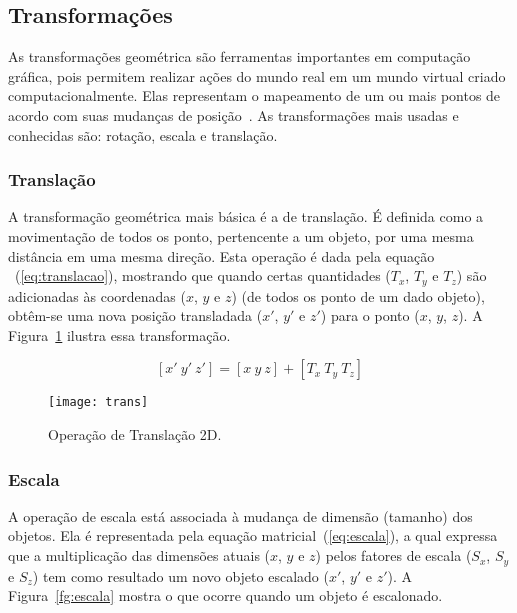 
\subsection{Transformações}
As transformações geométrica são ferramentas importantes em computação gráfica, pois permitem realizar ações do mundo real em um mundo virtual criado computacionalmente. Elas representam o mapeamento de um ou mais pontos de acordo com suas mudanças de posição~\cite{comp_grafica1}. As transformações mais usadas e conhecidas são: rotação, escala e translação. 

\subsubsection{Translação}
	A transformação geométrica mais básica é a de translação. É definida como a movimentação de todos os ponto, pertencente a um objeto, por uma mesma distância em uma mesma direção. Esta operação é dada pela equação ~(\ref{eq:translacao}), mostrando que quando certas quantidades ($T_x$, $T_y$ e $T_z$) são adicionadas às coordenadas ($x$, $y$ e $z$) (de todos os ponto de um dado objeto), obtêm-se uma nova posição transladada ($x'$, $y'$ e $z'$) para o ponto ($x$, $y$, $z$). A Figura~\ref{fg:trans} ilustra essa transformação. 

\begin{equation}\label{eq:translacao}
[x'\ y'\ z'] = [x\ y\ z] + [T_{x}\ T_{y}\ T_{z}]
\end{equation}

\begin{figure}[!ht]
	\centering
	\texttt{[image: trans]}
	\caption{Operação de Translação 2D.}
	\label{fg:trans}
\end{figure} 

\subsubsection{Escala}
	A operação de escala está associada à mudança de dimensão (tamanho) dos objetos. Ela é representada pela equação matricial~(\ref{eq:escala}), a qual expressa que a multiplicação das dimensões atuais ($x$, $y$ e $z$) pelos fatores de escala ($S_x$, $S_y$ e $S_z$) tem como resultado um novo objeto escalado ($x'$, $y'$ e $z'$). A Figura~\ref{fg:escala} mostra o que ocorre quando um objeto é escalonado.

